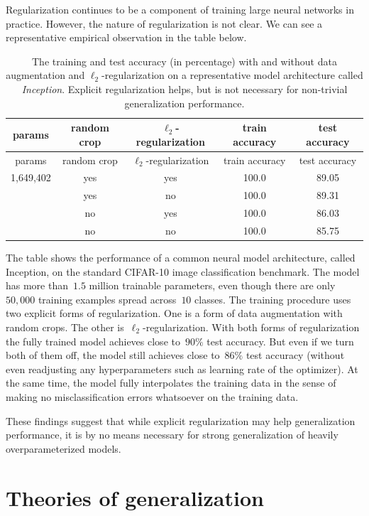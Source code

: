 \documentclass{tufte-book}
\begin{document}
Regularization continues to be a component of training large neural
networks in practice. However, the nature of regularization is not
clear. We can see a representative empirical observation in the table
below.

\begin{longtable}[]{@{}ccccc@{}}
\caption{The training and test accuracy (in percentage) with and without
data augmentation and \(\ell_2\)-regularization on a representative
model architecture called \emph{Inception}. Explicit regularization
helps, but is not necessary for non-trivial generalization
performance.}\tabularnewline
\toprule
params & random crop & \(\ell_2\)-regularization & train accuracy & test
accuracy \\
\midrule
\endfirsthead
\toprule
params & random crop & \(\ell_2\)-regularization & train accuracy & test
accuracy \\
\midrule
\endhead
1,649,402 & yes & yes & 100.0 & 89.05 \\
& yes & no & 100.0 & 89.31 \\
& no & yes & 100.0 & 86.03 \\
& no & no & 100.0 & 85.75 \\
\bottomrule
\end{longtable}

The table shows the performance of a common neural model architecture,
called Inception, on the standard CIFAR-10 image classification
benchmark. The model has more than~\(1.5\) million trainable parameters,
even though there are only~\(50,000\) training examples spread
across~\(10\) classes. The training procedure uses two explicit forms of
regularization. One is a form of data augmentation with random crops.
The other is~\(\ell_2\)-regularization. With both forms of
regularization the fully trained model achieves close to~\(90\%\) test
accuracy. But even if we turn both of them off, the model still achieves
close to~\(86\%\) test accuracy (without even readjusting any
hyperparameters such as learning rate of the optimizer). At the same
time, the model fully interpolates the training data in the sense of
making no misclassification errors whatsoever on the training data.

These findings suggest that while explicit regularization may help
generalization performance, it is by no means necessary for strong
generalization of heavily overparameterized models.

\hypertarget{theories-of-generalization}{%
\section{Theories of generalization}\label{theories-of-generalization}}
\end{document}
